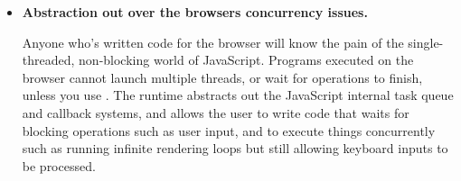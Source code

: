 \begin{itemize}
    \item \textbf{Abstraction out over the browsers concurrency issues.}
        
        Anyone who's written code for the browser will know the pain of the single-threaded, non-blocking world of JavaScript. Programs executed on the browser cannot launch multiple threads, or wait for operations to finish, unless you use \Setanta{}. The \Setanta{} runtime abstracts out the JavaScript internal task queue and callback systems, and allows the user to write code that waits for blocking operations such as user input, and to execute things concurrently such as running infinite rendering loops but still allowing keyboard inputs to be processed.

\end{itemize}
